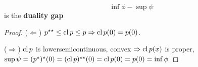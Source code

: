 \begin{defn}
  \label{defn:conjugate_functions:12}
  \begin{equation}
    \label{eq:61}
    \inf \phi - \sup \psi
  \end{equation} is the \textbf{duality gap}
\end{defn}

\begin{proof}
  ($\Leftarrow$) $p^{\star \star} \leq \operatorname*{cl} p \leq p \Rightarrow \operatorname*{cl}
  p(0) = p(0)$.
  
  ($\Rightarrow$) $\operatorname*{cl} p$ is lowersemicontinuous, convex $\Rightarrow
  \operatorname*{cl} p(x)$  is proper, $\sup \psi = (p^{\star})^{\star}(0) = (\operatorname*{cl} p)^{\star
    \star}(0) = \operatorname*{cl} p(0) = p(0) = \inf \phi$
\end{proof}

\begin{proposition}
\end{proposition}


